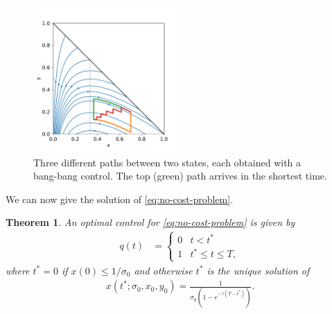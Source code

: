 \documentclass[english,12pt,letter]{article}
\newtheorem{thm}{Theorem}
\newcommand{\Rnot}{\sigma_0}
\begin{document}
\begin{figure}
    \centering
    \includegraphics[width=0.5\textwidth]{figures/threepaths.pdf}
    \caption{Three different paths between two states, each obtained
    with a bang-bang control.  The top (green) path arrives in the shortest time.\label{fig:bangbangtraj}}
\end{figure}
We can now give the solution of \eqref{eq:no-cost-problem}.
\begin{thm}
An optimal control for \eqref{eq:no-cost-problem} is given by
\begin{align}
    q(t) & = \begin{cases}  
        0 & t<t^* \\
        1 & t^* \le  t \le T,
    \end{cases}
\end{align}
where $t^*=0$ if $x(0)\le1/\sigma_0$ and otherwise $t^*$ is the unique solution of
\begin{align} \label{xtstar}
    x(t^*;\Rnot,x_0,y_0) = \frac{1}{\sigma_0(1-e^{-\gamma(T-t^*)})}.
\end{align}
\end{thm}
\end{document}
